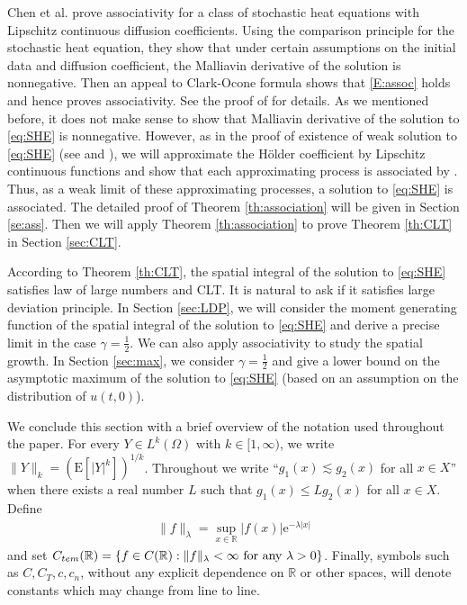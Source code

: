 \documentclass[12pt, reqno]{amsart}
\newcommand{\R}{{\mathbb{R}}}
\newcommand{\E}{\mathrm{E}}
\newcommand{\<}{\langle}
\renewcommand{\>}{\rangle}
\newcommand{\e}{\mathrm{e}}
\begin{document}
Chen et al. \cite[Theorem A.4]{CKNP23} prove associativity for a class of 
stochastic heat equations with Lipschitz continuous diffusion 
coefficients.  Using  the comparison principle for the stochastic heat 
equation, they show that under certain assumptions on the initial data and 
diffusion coefficient, the Malliavin derivative of the solution is 
nonnegative. Then an appeal to Clark-Ocone formula shows that 
\eqref{E:assoc} holds and hence proves associativity. See the proof of 
\cite[Theorem A.4]{CKNP23} for details. As we mentioned before, it does 
not make sense to show that Malliavin derivative of the solution to 
\eqref{eq:SHE} is nonnegative. However, as in the proof of existence 
of weak solution to \eqref{eq:SHE} (see \cite[Theorem 1.1]{MP11} and 
\cite[Theorem 1.2]{MPS06}), we will approximate the H\"older coefficient 
by Lipschitz continuous functions and show that each approximating process 
is associated by  \cite[Theorem A.4]{CKNP23}. Thus, as a weak limit of 
these approximating processes,  a solution to \eqref{eq:SHE} is 
associated. The detailed proof of Theorem \ref{th:association} will be 
given in Section \ref{se:ass}. Then we will apply Theorem \ref{th:association} to
prove Theorem \ref{th:CLT} in Section \ref{sec:CLT}.

According to Theorem \ref{th:CLT}, the spatial integral of the solution to \eqref{eq:SHE} satisfies law of large numbers and CLT. 
It is natural to ask if it satisfies large deviation principle. In Section \ref{sec:LDP},  we will consider the moment generating 
function of the spatial integral of the solution to \eqref{eq:SHE} and derive a precise limit in the case $\gamma=\frac12$.
We can also apply associativity to study the spatial growth. In Section \ref{sec:max}, we consider $\gamma=\frac12$
and give a lower bound on the asymptotic maximum of the solution to \eqref{eq:SHE} (based on an assumption on the distribution of $u(t,0)$).


We conclude this section with a brief overview of the notation used throughout the paper.
For every $Y\in L^k(\Omega)$ with $k\in[1,\infty)$, we write $\|Y\|_k=(\E[|Y|^k])^{1/k}$.  Throughout we write ``$g_1(x)\lesssim g_2(x)$ for all $x\in X$'' when
there exists a real number $L$ such that $g_1(x)\le Lg_2(x)$ for all $x\in X$.
Define
\begin{align*}
\|f\|_\lambda = \sup_{x\in \R}|f(x)|\e^{-\lambda |x|}
\end{align*}
and set 
$C_{tem}(\R)= \{f\in C(\R): \|f\|_\lambda <\infty\,\, \text{for any $ \lambda>0$}\}$. 
Finally, symbols such as $C,C_T,c,c_n$, without any explicit dependence on 
$\R$ or other spaces, will denote constants which may change from 
line to line.  
\end{document}
